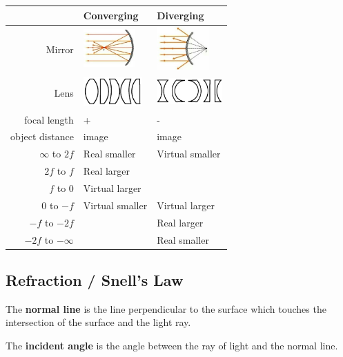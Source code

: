 \begin{center}
	\begin{tabular}{r | l l} 
		 & Converging & Diverging \\
		\hline
		Mirror & \includegraphics[width=2cm]{content/soundlight/ConvergingMirror.jpg} & \includegraphics[width=2cm]{content/soundlight/DivergingMirror.jpg} \\
		Lens & \includegraphics[width=2.25cm]{content/soundlight/ConvergingLenses.pdf} & \includegraphics[width=2.5cm]{content/soundlight/DivergingLenses.pdf} \\
		focal length & + & - \\
		\hline
		object distance & image & image \\
		\hline
		$\infty$ to $2f$ & Real smaller & Virtual smaller \\
		$2f$ to $f$ & Real larger & \\
		$f$ to $0$ & Virtual larger & \\
		\hline
		$0$ to $-f$ & Virtual smaller & Virtual larger \\
		$-f$ to $-2f$ & & Real larger \\
		$-2f$ to $-\infty$ & & Real smaller \\
	\end{tabular}
\end{center}

\subsection{Refraction / Snell's Law}

The \textbf{normal line} is the line perpendicular to the surface which touches the intersection of the surface and the light ray.

The \textbf{incident angle} is the angle between the ray of light and the normal line.

